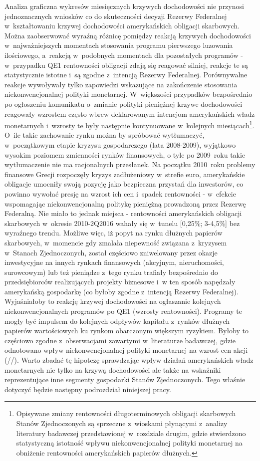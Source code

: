 Analiza graficzna wykresów miesięcznych krzywych dochodowości nie przynosi jednoznacznych wniosków co do skuteczności decyzji Rezerwy Federalnej w~kształtowaniu krzywej dochodowości amerykańskich obligacji skarbowych. Można zaobserwować wyraźną różnicę pomiędzy reakcją krzywych dochodowości w~najważniejszych momentach stosowania programu pierwszego luzowania ilościowego, a~reakcją w~podobnych momentach dla pozostałych programów - w~przypadku \acs{QE}1 rentowności obligacji zdają się reagować silniej, reakcje te są statystycznie istotne i~są zgodne z~intencją Rezerwy Federalnej. Porównywalne reakcje wywoływały tylko zapowiedzi wskazujące na zakończenie stosowania niekonwencjonalnej polityki monetarnej. W~większości przypadków bezpośrednio po ogłoszeniu komunikatu o~zmianie polityki pieniężnej krzywe dochodowości reagowały wzrostem często wbrew deklarowanym intencjom amerykańskich władz monetarnych i~wzrosty te były następnie kontynuowane w~kolejnych miesiącach\footnote{Opisywane zmiany rentowności długoterminowych obligacji skarbowych Stanów Zjednoczonych są sprzeczne z~wioskami płynącymi z~analizy literatury badawczej przedstawionej w~rozdziale drugim, gdzie stwierdzono statystyczną istotność wpływu niekonwencjonalnej polityki monetarnej na obniżenie rentowności amerykańskich papierów dłużnych.}. O~ile takie zachowanie rynku można by spróbować wytłumaczyć, w~początkowym etapie kryzysu gospodarczego (lata 2008-2009), wyjątkowo wysokim poziomem zmienności rynków finansowych, o tyle po 2009~roku takie wytłumaczenie nie ma racjonalnych przesłanek. Na początku 2010~roku problemy finansowe Grecji rozpoczęły kryzys zadłużeniowy w~strefie euro, amerykańskie obligacje umocniły swoją pozycję jako bezpieczna przystań dla inwestorów, co powinno wywołać presję na wzrost ich cen i~spadek rentowności - w~efekcie wspomagając niekonwencjonalną politykę pieniężną prowadzoną przez Rezerwę Federalną. Nie miało to jednak miejsca - rentowności amerykańskich obligacji skarbowych w~okresie 2010-2Q2016 wahały się w~tunelu [0,25\%; 3-4,5\%] bez wyraźnego trendu. Możliwe więc, iż popyt na rynku dłużnych papierów skarbowych, w~momencie gdy zmalała niepewność związana z~kryzysem w~Stanach Zjednoczonych, został częściowo zniwelowany przez okazje inwestycyjne na innych rynkach finansowych (akcyjnym, nieruchomości, surowcowym) lub też pieniądze z~tego rynku trafiały bezpośrednio do przedsiębiorców realizujących projekty biznesowe i~w ten sposób napędzały amerykańską gospodarkę (co byłoby zgodne z~intencją Rezerwy Federalnej). Wyjaśniałoby to reakcję krzywej dochodowości na ogłaszanie kolejnych niekonwencjonalnych programów po \acs{QE}1 (wzrosty rentowności). Programy te mogły być impulsem do kolejnych odpływów kapitału z~rynków dłużnych papierów wartościowych ku rynkom obarczonym większym ryzykiem. Byłoby to częściowo zgodne z~obserwacjami zawartymi w~literaturze badawczej, gdzie odnotowano wpływ niekonwencjonalnej polityki monetarnej na wzrost cen akcji (\cite{chen36}/\cite{bhattarai36}/\cite{swanson37}). Warto zbadać tę hipotezę sprawdzając wpływ działań amerykańskich władz monetarnych nie tylko na krzywą dochodowości ale także na wskaźniki reprezentujące inne segmenty gospodarki Stanów Zjednoczonych. Tego właśnie dotyczyć będzie następny podrozdział niniejszej pracy.

